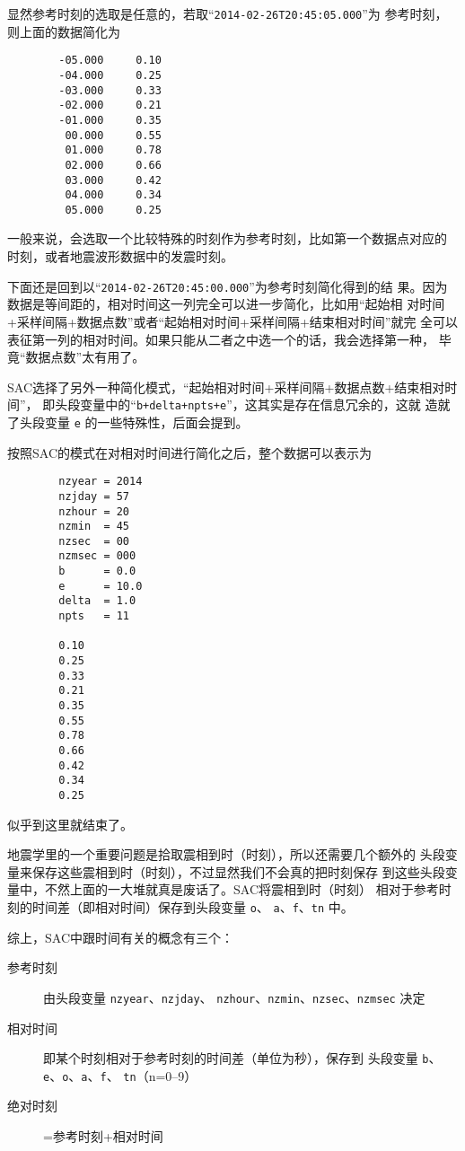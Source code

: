显然参考时刻的选取是任意的，若取``\texttt{2014-02-26T20:45:05.000}''为
参考时刻，则上面的数据简化为
\begin{verbatim}
        -05.000     0.10
        -04.000     0.25
        -03.000     0.33
        -02.000     0.21
        -01.000     0.35
         00.000     0.55
         01.000     0.78
         02.000     0.66
         03.000     0.42
         04.000     0.34
         05.000     0.25
\end{verbatim}

一般来说，会选取一个比较特殊的时刻作为参考时刻，比如第一个数据点对应的
时刻，或者地震波形数据中的发震时刻。

下面还是回到以``\texttt{2014-02-26T20:45:00.000}''为参考时刻简化得到的结
果。因为数据是等间距的，相对时间这一列完全可以进一步简化，比如用``起始相
对时间+采样间隔+数据点数''或者``起始相对时间+采样间隔+结束相对时间''就完
全可以表征第一列的相对时间。如果只能从二者之中选一个的话，我会选择第一种，
毕竟``数据点数''太有用了。

SAC选择了另外一种简化模式，``起始相对时间+采样间隔+数据点数+结束相对时间''，
即头段变量中的``\texttt{b+delta+npts+e}''，这其实是存在信息冗余的，这就
造就了头段变量 \texttt{e} 的一些特殊性，后面会提到。

按照SAC的模式在对相对时间进行简化之后，整个数据可以表示为
\begin{verbatim}
        nzyear = 2014
        nzjday = 57
        nzhour = 20
        nzmin  = 45
        nzsec  = 00
        nzmsec = 000
        b      = 0.0
        e      = 10.0
        delta  = 1.0
        npts   = 11

        0.10
        0.25
        0.33
        0.21
        0.35
        0.55
        0.78
        0.66
        0.42
        0.34
        0.25
\end{verbatim}
似乎到这里就结束了。

地震学里的一个重要问题是拾取震相到时（时刻），所以还需要几个额外的
头段变量来保存这些震相到时（时刻），不过显然我们不会真的把时刻保存
到这些头段变量中，不然上面的一大堆就真是废话了。SAC将震相到时（时刻）
相对于参考时刻的时间差（即相对时间）保存到头段变量 \texttt{o}、
\texttt{a}、\texttt{f}、\texttt{tn} 中。

综上，SAC中跟时间有关的概念有三个：
\begin{description}
\item [参考时刻] 由头段变量 \texttt{nzyear}、\texttt{nzjday}、
    \texttt{nzhour}、\texttt{nzmin}、\texttt{nzsec}、\texttt{nzmsec} 决定
\item [相对时间] 即某个时刻相对于参考时刻的时间差（单位为秒），保存到
    头段变量 \texttt{b}、\texttt{e}、\texttt{o}、\texttt{a}、\texttt{f}、
    \texttt{tn}（n=0--9）
\item [绝对时刻] =参考时刻+相对时间
\end{description}

